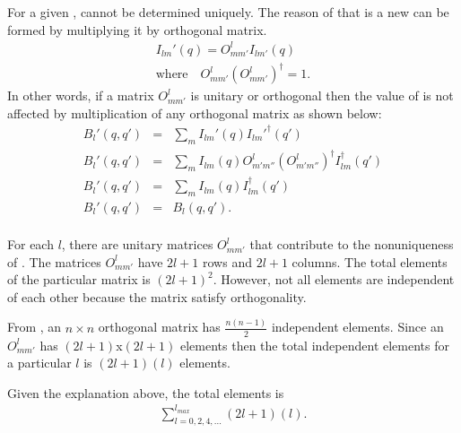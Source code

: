 For a given \Blq, \Ilm cannot be determined uniquely. The reason of that is a new \Ilm can be formed by multiplying it by orthogonal matrix. 
\begin{eqnarray}
I_{lm}'(q)=O^{l}_{mm'}I_{lm'}(q)  \\
\mbox{where} \quad O^{l}_{mm'} (O^{l}_{mm'})^{\dagger} =1. 
\label{eq:ilmolm}
\end{eqnarray}
In other words, if a matrix $O^{l}_{mm'}$ is unitary or orthogonal then the value of \Blq is not affected by multiplication of any orthogonal matrix as shown below:
\begin{eqnarray}
B_{l}'(q,q')&=&\sum_{m} I_{lm}'(q) I_{lm}'^{\dagger}(q') \\
B_{l}'(q,q')&=&\sum_{m} I_{lm}(q) O^{l}_{m'm''} (O^{l}_{m'm''})^{\dagger} I_{lm}^{\dagger}(q') \\ \nonumber
B_{l}'(q,q')&=&\sum_{m} I_{lm}(q)  I_{lm}^{\dagger}(q') \\ \nonumber
B_{l}'(q,q')&=&B_{l}(q,q'). \\ \nonumber
\label{eq:Blilmolm}
\end{eqnarray}

For each $l$, there are unitary matrices $O^{l}_{mm'}$ that contribute to the nonuniqueness of \Ilm. The matrices $O^{l}_{mm'}$ have $2l+1$ rows and $2l+1$ columns. The total elements of the particular matrix is $(2l+1)^2$. However, not all elements are independent of each other because the matrix satisfy orthogonality. 

From \cite{tinkham}, an $n \times n$ orthogonal matrix has $\frac{n(n-1)}{2}$ independent elements. Since an $O^{l}_{mm'}$ has $(2l+1)$x$(2l+1)$ elements then the total independent elements for a particular $l$ is $(2l+1)(l)$ elements. 

Given the explanation above, the total elements is
\begin{eqnarray}
\sum_{l=0,2,4,...}^{l_{max}} (2l+1)(l).
\label{eq:indcomp}
\end{eqnarray}

